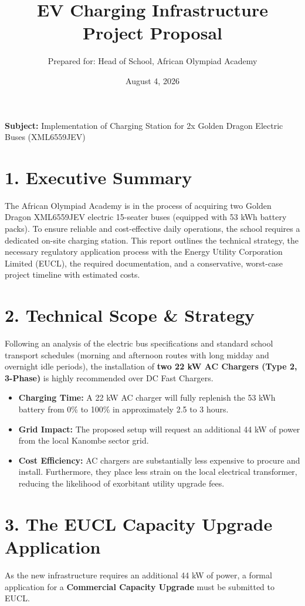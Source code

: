 \documentclass[11pt,a4paper]{article}
\title{\textbf{EV Charging Infrastructure Project Proposal}}
\author{Prepared for: Head of School, African Olympiad Academy}
\date{August 4, 2026}
\begin{document}
\maketitle
\thispagestyle{empty}

\vspace{1em}
\noindent\textbf{Subject:} Implementation of Charging Station for 2x Golden Dragon Electric Buses (XML6559JEV)
\vspace{2em}

\section{1. Executive Summary}
The African Olympiad Academy is in the process of acquiring two Golden Dragon XML6559JEV electric 15-seater buses (equipped with 53 kWh battery packs). To ensure reliable and cost-effective daily operations, the school requires a dedicated on-site charging station. This report outlines the technical strategy, the necessary regulatory application process with the Energy Utility Corporation Limited (EUCL), the required documentation, and a conservative, worst-case project timeline with estimated costs.

\section{2. Technical Scope \& Strategy}
Following an analysis of the electric bus specifications and standard school transport schedules (morning and afternoon routes with long midday and overnight idle periods), the installation of \textbf{two 22 kW AC Chargers (Type 2, 3-Phase)} is highly recommended over DC Fast Chargers.

\begin{itemize}
    \item \textbf{Charging Time:} A 22 kW AC charger will fully replenish the 53 kWh battery from 0\% to 100\% in approximately 2.5 to 3 hours.
    \item \textbf{Grid Impact:} The proposed setup will request an additional 44 kW of power from the local Kanombe sector grid.
    \item \textbf{Cost Efficiency:} AC chargers are substantially less expensive to procure and install. Furthermore, they place less strain on the local electrical transformer, reducing the likelihood of exorbitant utility upgrade fees.
\end{itemize}

\section{3. The EUCL Capacity Upgrade Application}
As the new infrastructure requires an additional 44 kW of power, a formal application for a \textbf{Commercial Capacity Upgrade} must be submitted to EUCL.
\end{document}
